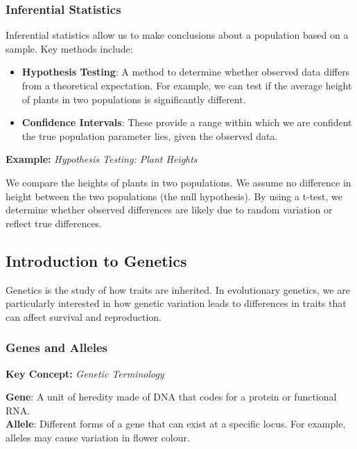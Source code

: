 \documentclass[12pt,a4paper]{article}
\newenvironment{keyconceptbox}[1][]
{\begin{basebox}[linecolor=uqblue]
\textbf{\color{uqblue}Key Concept:} \textit{#1}\par\noindent\ignorespaces}
{\end{basebox}}
\newenvironment{example}[1][]
{\begin{basebox}[linecolor=uqgold]
\textbf{\color{uqgold}Example:} \textit{#1}\par\noindent\ignorespaces}
{\end{basebox}}
\begin{document}
\subsubsection{Inferential Statistics}

Inferential statistics allow us to make conclusions about a population based on a sample. Key methods include:

\begin{itemize}
    \item \textbf{Hypothesis Testing}: A method to determine whether observed data differs from a theoretical expectation. For example, we can test if the average height of plants in two populations is significantly different.
    \item \textbf{Confidence Intervals}: These provide a range within which we are confident the true population parameter lies, given the observed data.
\end{itemize}

\begin{example}[Hypothesis Testing: Plant Heights]
We compare the heights of plants in two populations. We assume no difference in height between the two populations (the null hypothesis). By using a t-test, we determine whether observed differences are likely due to random variation or reflect true differences.
\end{example}

\subsection{Introduction to Genetics}

Genetics is the study of how traits are inherited. In evolutionary genetics, we are particularly interested in how genetic variation leads to differences in traits that can affect survival and reproduction.

\subsubsection{Genes and Alleles}

\begin{keyconceptbox}[Genetic Terminology]
\textbf{Gene}: A unit of heredity made of DNA that codes for a protein or functional RNA.\\
\textbf{Allele}: Different forms of a gene that can exist at a specific locus. For example, alleles may cause variation in flower colour.
\end{keyconceptbox}
\end{document}
